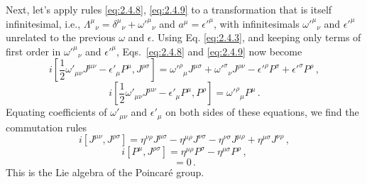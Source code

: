 Next, let's apply rules \eqref{eq:2.4.8}, \eqref{eq:2.4.9} to a transformation that is itself
infinitesimal, i.e., $\Lambda^\mu{}_{\nu}=\delta^\mu{}_{\nu}+\omega'^\mu{}_{\nu}$
and $a^\mu=\epsilon'^\mu$, with infinitesimals $\omega'^\mu{}_{\nu}$ and
$\epsilon'^\mu$ unrelated to the previous $\omega$ and $\epsilon$. Using Eq.
\eqref{eq:2.4.3}, and keeping only terms of first order in $\omega'^\mu{}_{\nu}$ and
$\epsilon'^\mu$, Eqs.~\eqref{eq:2.4.8} and \eqref{eq:2.4.9} now become
\begin{equation}
i\left[\frac12\omega'_{\mu\nu}J^{\mu\nu}-\epsilon'_\mu P^\mu,
J^{\rho\sigma}\right]
=\omega'^\rho{}_{\mu}J^{\mu\sigma}
+\omega'^\sigma{}_{\nu}J^{\rho\nu}
-\epsilon'^\rho P^\sigma+\epsilon'^\sigma P^\rho\,,
\tag{2.4.10}\label{eq:2.4.10}
\end{equation}
\begin{equation}
i\left[\frac12\omega'_{\mu\nu}J^{\mu\nu}-\epsilon'_\mu P^\mu,
P^\rho\right]
=\omega'^\rho{}_{\mu}P^\mu\,.
\tag{2.4.11}\label{eq:2.4.11}
\end{equation}
Equating coefficients of $\omega'_{\mu\nu}$ and $\epsilon'_\mu$ on both sides
of these equations, we find the commutation rules
\begin{equation}
i[J^{\mu\nu},J^{\rho\sigma}]
=\eta^{\nu\rho}J^{\mu\sigma}-\eta^{\mu\rho}J^{\nu\sigma}
-\eta^{\nu\sigma}J^{\mu\rho}+\eta^{\mu\sigma}J^{\nu\rho}\,,
\tag{2.4.12}\label{eq:2.4.12}
\end{equation}
\begin{equation}
i[P^\mu,J^{\rho\sigma}]
=\eta^{\mu\rho}P^\sigma-\eta^{\mu\sigma}P^\rho\,,
\tag{2.4.13}\label{eq:2.4.13}
\end{equation}
\begin{equation}
[P^\mu,P^\rho]=0\,.
\tag{2.4.14}\label{eq:2.4.14}
\end{equation}
This is the Lie algebra of the Poincar\'e group.

